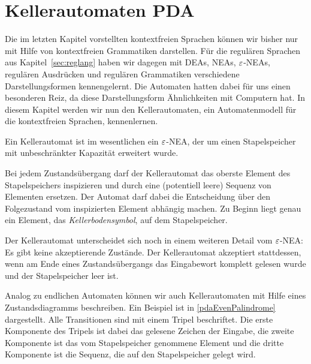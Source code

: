 \section[Kellerautomaten (\acs*{PDA})]{Kellerautomaten \quad\normalfont\normalsize \acf{PDA}}
\newcommand{\ConfRel}{\rhd}
\newcommand{\Zinit}{Z^\mathsf{init}}
\newcommand{\K}{\mathcal{K}}
\newcommand{\el}[3]{{\color{red!70!black}#1};{\color{blue!70!black}#2};{\color{blue!70!black}#3}}

Die im letzten Kapitel vorstellten kontextfreien Sprachen können wir bisher nur mit Hilfe von kontextfreien Grammatiken darstellen.
Für die regulären Sprachen aus Kapitel~\ref{sec:reglang} haben wir dagegen mit DEAs, NEAs, $\varepsilon$-NEAs, regulären Ausdrücken und regulären Grammatiken verschiedene Darstellungsformen kennengelernt.
Die Automaten hatten dabei für uns einen besonderen Reiz, da diese Darstellungsform Ähnlichkeiten mit Computern hat.
In diesem Kapitel werden wir nun den Kellerautomaten, ein Automatenmodell für die kontextfreien Sprachen, kennenlernen.

Ein Kellerautomat ist im wesentlichen ein $\varepsilon$-NEA, der um einen Stapelspeicher mit unbeschränkter Kapazität erweitert wurde.

Bei jedem Zustandsübergang darf der Kellerautomat das oberste Element des Stapelspeichers inspizieren und durch eine (potentiell leere) Sequenz von Elementen ersetzen.
Der Automat darf dabei die Entscheidung über den Folgezustand vom inspizierten Element abhängig machen.
Zu Beginn liegt genau ein Element, das \emph{Kellerbodensymbol}, auf dem Stapelspeicher.

Der Kellerautomat unterscheidet sich noch in einem weiteren Detail vom $\varepsilon$-NEA:
Es gibt keine akzeptierende Zustände. 
Der Kellerautomat akzeptiert stattdessen, wenn am Ende eines Zustandsübergangs das Eingabewort komplett gelesen wurde
und der Stapelspeicher leer ist.

Analog zu endlichen Automaten können wir auch Kellerautomaten mit Hilfe eines Zustandsdiagramms beschreiben.
Ein Beispiel ist in \autoref{pdaEvenPalindrome} dargestellt.
Alle Transitionen sind mit einem Tripel beschriftet. 
Die erste Komponente des Tripels ist dabei das gelesene Zeichen der Eingabe,
die zweite Komponente ist das vom Stapelspeicher genommene Element und
die dritte Komponente ist die Sequenz, die auf den Stapelspeicher gelegt wird.

